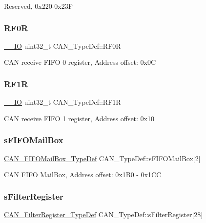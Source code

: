 Reserved, 0x220-\/0x23F \mbox{\label{struct_c_a_n___type_def_ad8e858479e26ab075ee2ddb630e8769d}} 
\subsubsection{\texorpdfstring{RF0R}{RF0R}}
{\footnotesize\ttfamily \mbox{\hyperlink{core__sc300_8h_aec43007d9998a0a0e01faede4133d6be}{\+\_\+\+\_\+\+IO}} uint32\+\_\+t C\+A\+N\+\_\+\+Type\+Def\+::\+R\+F0R}

C\+AN receive F\+I\+FO 0 register, Address offset\+: 0x0C \mbox{\label{struct_c_a_n___type_def_a69a528d1288c1de666df68655af1d20e}} 
\subsubsection{\texorpdfstring{RF1R}{RF1R}}
{\footnotesize\ttfamily \mbox{\hyperlink{core__sc300_8h_aec43007d9998a0a0e01faede4133d6be}{\+\_\+\+\_\+\+IO}} uint32\+\_\+t C\+A\+N\+\_\+\+Type\+Def\+::\+R\+F1R}

C\+AN receive F\+I\+FO 1 register, Address offset\+: 0x10 \mbox{\label{struct_c_a_n___type_def_aa6053bc607535d9ecf7a3d887c0cc053}} 
\subsubsection{\texorpdfstring{sFIFOMailBox}{sFIFOMailBox}}
{\footnotesize\ttfamily \mbox{\hyperlink{struct_c_a_n___f_i_f_o_mail_box___type_def}{C\+A\+N\+\_\+\+F\+I\+F\+O\+Mail\+Box\+\_\+\+Type\+Def}} C\+A\+N\+\_\+\+Type\+Def\+::s\+F\+I\+F\+O\+Mail\+Box\mbox{[}2\mbox{]}}

C\+AN F\+I\+FO Mail\+Box, Address offset\+: 0x1\+B0 -\/ 0x1\+CC \mbox{\label{struct_c_a_n___type_def_a23a22b903fdc909ac9f61edd68029f35}} 
\subsubsection{\texorpdfstring{sFilterRegister}{sFilterRegister}}
{\footnotesize\ttfamily \mbox{\hyperlink{struct_c_a_n___filter_register___type_def}{C\+A\+N\+\_\+\+Filter\+Register\+\_\+\+Type\+Def}} C\+A\+N\+\_\+\+Type\+Def\+::s\+Filter\+Register\mbox{[}28\mbox{]}}

